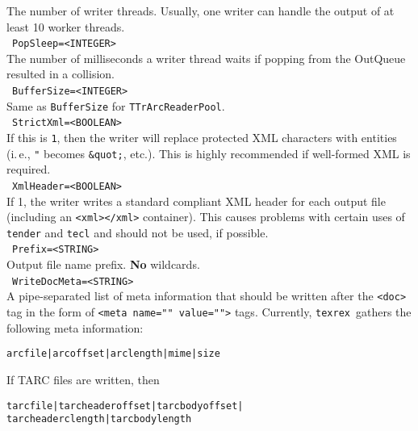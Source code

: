 \documentclass[12pt,a4paper]{article}
\newcommand{\trthis}{\texttt{texrex}}
\begin{document}
The number of writer threads.
Usually, one writer can handle the output of at least 10 worker threads.\\

\noindent\textbullet~\texttt{PopSleep=<INTEGER>}\\

The number of milliseconds a writer thread waits if popping from the OutQueue resulted in a collision.\\

\noindent\textbullet~\texttt{BufferSize=<INTEGER>}\\

Same as \texttt{BufferSize} for \texttt{TTrArcReaderPool}.\\

\noindent\textbullet~\texttt{StrictXml=<BOOLEAN>}\\

If this is \texttt{1}, then the writer will replace protected XML characters with entities (i.\,e., \texttt{"} becomes \texttt{\&quot;}, etc.).
This is highly recommended if well-formed XML is required.\\

\noindent\textbullet~\texttt{XmlHeader=<BOOLEAN>}\\

If 1, the writer writes a standard compliant XML header for each output file (including an \texttt{<xml></xml>} container).
This causes problems with certain uses of \texttt{tender} and \texttt{tecl} and should not be used, if possible.\\

\noindent\textbullet~\texttt{Prefix=<STRING>}\\

Output file name prefix.
\textbf{No} wildcards.\\

\noindent\textbullet~\texttt{WriteDocMeta=<STRING>}\\

A pipe-separated list of meta information that should be written after the \texttt{<doc>} tag in the form of \texttt{<meta name="" value="">} tags.
Currently, \trthis\ gathers the following meta information:

\begin{center}
  \texttt{arcfile|arcoffset|arclength|mime|size}
\end{center}

If TARC files are written, then

\begin{center}
  \texttt{tarcfile|tarcheaderoffset|tarcbodyoffset|\\
  tarcheaderclength|tarcbodylength} 
\end{center}
\end{document}
